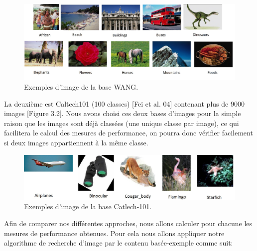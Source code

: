 \begin{figure}[H]
	\centering
		\includegraphics[width=7in]{Figures/wang.jpg}
	\caption[An Electron]{Exemples d'image de la base WANG.}
	\label{fig:Electron}
\end{figure}

	La deuxième est Caltech101 (100 classes) [Fei et al. 04] contenant plus de 9000 images [Figure 3.2]. Nous avons choisi ces deux bases d'images pour la simple raison que les images sont déjà classées (une unique classe par image), ce qui facilitera le calcul des mesures de performance, on pourra donc vérifier facilement si deux images appartiennent à la même classe.
	


\begin{figure}[H]
	\centering
		\includegraphics[width=5.6in]{Figures/caltech101.jpg}
	\caption[An Electron]{Exemples d'image de la base Catlech-101.}
	\label{fig:Electron}
\end{figure}	
	
	
	Afin de comparer nos différentes approches, nous allons calculer pour chacune les mesures de performance obtenues. Pour cela nous allons appliquer notre algorithme de recherche d'image par le contenu basée-exemple comme suit:


